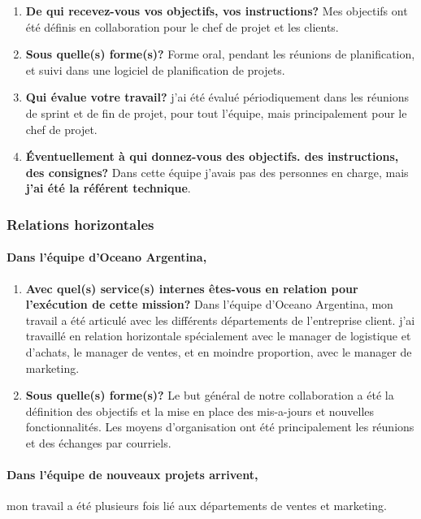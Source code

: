 \documentclass{resume} %
\begin{document}
		\begin{enumerate}
		\item \textbf{De qui recevez-vous vos objectifs, vos instructions?}
			Mes objectifs ont été définis en collaboration pour le chef de projet et les clients.
		\item \textbf{Sous quelle(s) forme(s)?}
			Forme oral, pendant les réunions de planification, et suivi dans une logiciel de planification de projets.
		\item \textbf{Qui évalue votre travail?}
			j'ai été évalué périodiquement dans les réunions de sprint et de fin de projet, pour tout l'équipe, mais principalement pour le chef de projet. 
		\item  \textbf{Éventuellement à qui donnez-vous des objectifs. des instructions, des consignes?}
			Dans cette équipe j'avais pas des  personnes en charge, mais \textbf{j'ai été la référent technique}.
		\end{enumerate}
		
					
	\subsubsection{Relations horizontales}
	
	
		\paragraph{Dans l'équipe d'Oceano Argentina,}
		
		\begin{enumerate}
		\item \textbf{Avec quel(s) service(s) internes êtes-vous en relation pour l'exécution de cette mission?}
			Dans l'équipe d'Oceano Argentina, mon travail a été articulé  avec  les différents départements de l'entreprise client. 
			j'ai travaillé en relation horizontale spécialement avec le manager de logistique et d'achats, 
			le manager de ventes, et en moindre proportion, avec le manager de marketing. 

		\item \textbf{Sous quelle(s) forme(s)?}
			Le but général de notre collaboration a été la définition des objectifs et la mise en place des mis-a-jours et nouvelles fonctionnalités. 
			Les moyens d'organisation ont été principalement les réunions et des échanges par courriels. 
		\end {enumerate}	
		
		\paragraph{Dans l'équipe de nouveaux projets arrivent,} mon travail a été plusieurs fois lié aux départements de ventes et marketing. 
		
\end{document}
